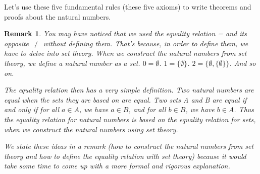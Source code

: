 \documentclass{article}
\newtheorem{remark}{Remark}
\begin{document}
Let's use these five fundamental rules (these five axioms) to write theorems and proofs about the natural numbers. 

\begin{remark}
You may have noticed that we used the equality relation = and its opposite $\neq$ without defining them. That's because, in order to define them, we have to delve into set theory. When we construct the natural numbers from set theory, we define a natural number as a set. $0 = \emptyset$. $1 = \{\emptyset\}$. $2 = \{\emptyset, \{\emptyset\}\}$. And so on.

The equality relation then has a very simple definition. Two natural numbers are equal when the sets they are based on are equal. Two sets A and B are equal if and only if for all $a \in A$, we have $a \in B$, and for all $b \in B$, we have $b \in A$. Thus the equality relation for natural numbers is based on the equality relation for sets, when we construct the natural numbers using set theory.

We state these ideas in a remark (how to construct the natural numbers from set theory and how to define the equality relation with set theory) because it would take some time to come up with a more formal and rigorous explanation.
\end{remark}
\end{document}
